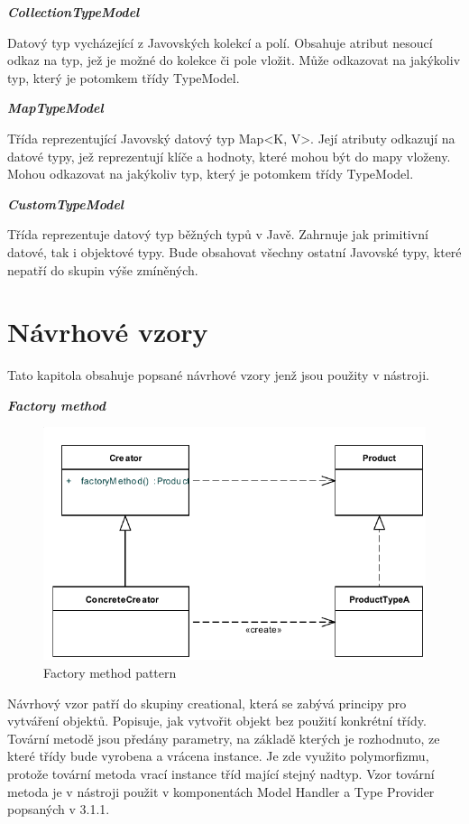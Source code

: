 \documentclass[11pt,twoside,a4paper]{book}
\begin{document}
\textbf{\textit{CollectionTypeModel}}

Datový typ vycházející z Javovských kolekcí a polí. Obsahuje atribut nesoucí odkaz na typ,
jež je možné do kolekce či pole vložit. Může odkazovat na jakýkoliv typ, který je potomkem
třídy TypeModel.

\textbf{\textit{MapTypeModel}}

Třída reprezentující Javovský datový typ Map<K, V>. Její atributy odkazují na datové typy,
jež reprezentují klíče a hodnoty, které mohou být do mapy vloženy. Mohou odkazovat na
jakýkoliv typ, který je potomkem třídy TypeModel.

\textbf{\textit{CustomTypeModel}}

Třída reprezentuje datový typ běžných typů v Javě. Zahrnuje jak primitivní datové, tak i
objektové typy. Bude obsahovat všechny ostatní Javovské typy, které nepatří do skupin výše
zmíněných.

\section{Návrhové vzory}

Tato kapitola obsahuje popsané návrhové vzory jenž jsou použity v nástroji.

\textbf{\textit{Factory method}}

\begin{figure}[h]
\begin{center}
\includegraphics[width=13cm]{images-pdf/Factory-Method-Design-Patternnew.pdf}
\caption{Factory method pattern}
\label{fig:logo}
\end{center}
\end{figure}

Návrhový vzor patří do skupiny creational, která se zabývá principy pro 
vytváření objektů. Popisuje, jak vytvořit objekt bez použití konkrétní třídy. 
Tovární metodě jsou předány parametry, na základě kterých je rozhodnuto, ze 
které třídy bude vyrobena a vrácena instance. Je zde využito polymorfizmu, 
protože tovární metoda vrací instance tříd mající stejný nadtyp. Vzor tovární 
metoda je v nástroji použit v komponentách Model Handler a Type Provider 
popsaných v 3.1.1.
\end{document}
